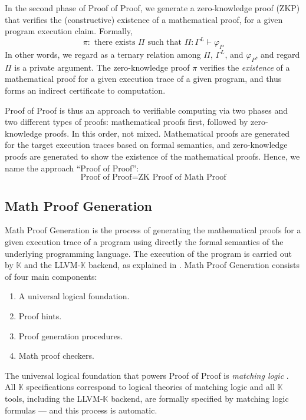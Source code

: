 \documentclass{article}
\newcommand{\K}{\ensuremath{\mathbb{K}}\xspace}
\begin{document}
In the second phase of Proof of Proof, we generate a zero-knowledge proof (ZKP) that verifies the
(constructive) existence of a mathematical proof, for a given program execution claim.
Formally,
\begin{equation}
\pi \colon \text{ there exists $\Pi$ such that } \Pi \colon \Gamma^L \vdash \varphi_P
\label{eq:zkproof}
\end{equation}
In other words, we regard 
as a ternary relation among $\Pi$, $\Gamma^L$, and $\varphi_P$, and regard $\Pi$ is a private argument.
The zero-knowledge proof $\pi$ verifies the \emph{existence} of a mathematical proof for a given
execution trace of a given program, and thus forms an indirect certificate to computation.

Proof of Proof is thus an approach to verifiable computing
via two phases and two different types of proofs: mathematical proofs first, followed by zero-knowledge proofs.
In this order, not mixed.
Mathematical proofs are generated for the target execution traces based on formal semantics,
and zero-knowledge proofs are generated to show the existence of the mathematical proofs.
Hence, we name the approach ``Proof of Proof'':
\begin{equation*}
\boxed{\text{Proof of Proof}} = \boxed{\text{ZK Proof of Math Proof}}
\end{equation*}

\subsection{Math Proof Generation}

Math Proof Generation is the process of generating the mathematical proofs
for a given execution trace of a program using directly
the formal semantics of the underlying programming language.
The execution of the program is carried out by \K and the LLVM-\K backend,
as explained in .
Math Proof Generation consists of four main components:
\begin{enumerate}
\item  A universal logical foundation.
\item Proof hints.
\item Proof generation procedures.
\item Math proof checkers.
\end{enumerate}

The universal logical foundation that powers Proof of Proof is \emph{matching logic}
\cite{matchinglogichomepage}. 
All \K specifications correspond to logical theories of matching logic
and all \K tools, including the LLVM-\K backend,
are formally specified by matching logic formulas --- and this process is automatic.
\end{document}
